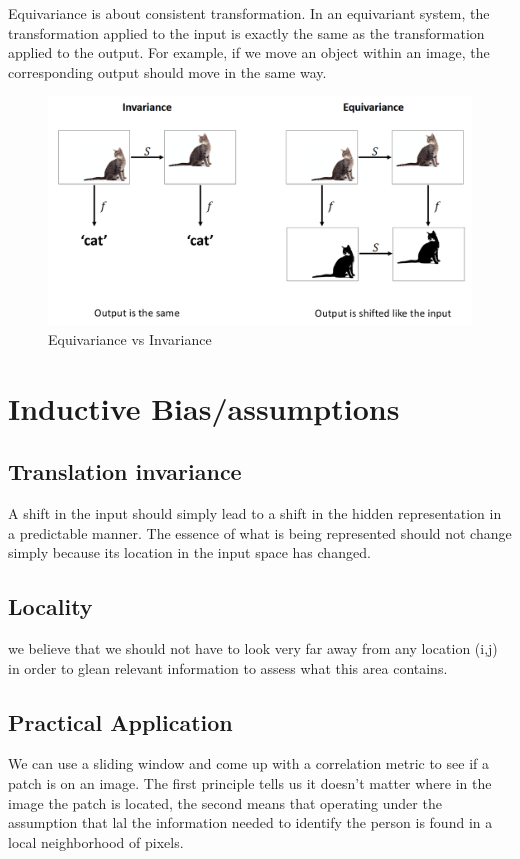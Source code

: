 \documentclass[11pt]{article}
\begin{document}
Equivariance is about consistent transformation. In an equivariant system, the transformation applied to the input is exactly the same as the transformation applied to the output. For example, if we move an object within an image, the corresponding output should move in the same way.

\begin{figure}[H]
    \centering
    \includegraphics[width=.7\textwidth]{figures/equivariance-vs-invariance.png}
    \caption{Equivariance vs Invariance}
\end{figure}

\section{Inductive Bias/assumptions}

\subsection{Translation invariance}

A shift in the input should simply lead to a shift in the hidden representation in a predictable manner. The essence of what is being represented should not change simply because its location in the input space has changed.

\subsection{Locality}

we believe that we should not have to look very far away from any location (i,j) in order to glean relevant information to assess what  this area contains.

\subsection{Practical Application}

We can use a sliding window and come up with a correlation metric to see if a patch is on an image. The first principle tells us it doesn't matter where in the image the patch is located, the second means that operating under the assumption that lal the information needed to identify the person is found in a local neighborhood of pixels.
\end{document}
